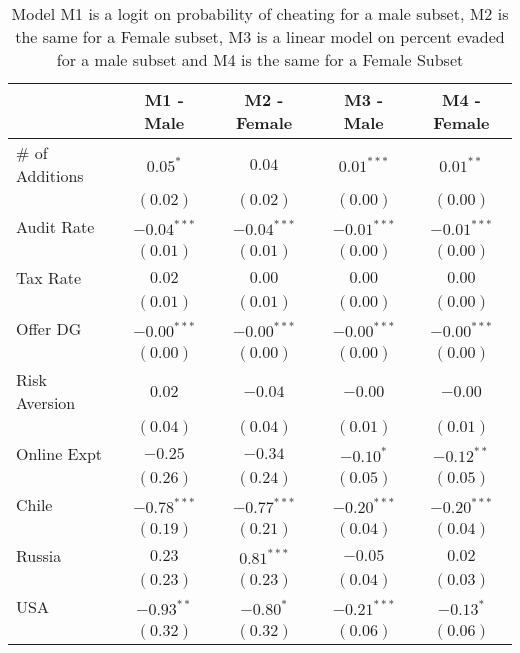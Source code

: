 
\begin{table}
\caption{Model M1 is a logit on probability of cheating for a male subset, M2 is the same for a Female subset, 
       M3 is a linear model on percent evaded for a male subset and M4 is the same for a Female Subset}
\begin{center}
\begin{tabular}{l c c c c }
\hline
 & M1 - Male & M2 - Female  & M3 - Male & M4 -Female \\
\hline
\# of Additions & $0.05^{*}$    & $0.04$        & $0.01^{***}$  & $0.01^{**}$   \\
                & $(0.02)$      & $(0.02)$      & $(0.00)$      & $(0.00)$      \\
Audit Rate      & $-0.04^{***}$ & $-0.04^{***}$ & $-0.01^{***}$ & $-0.01^{***}$ \\
                & $(0.01)$      & $(0.01)$      & $(0.00)$      & $(0.00)$      \\
Tax Rate        & $0.02$        & $0.00$        & $0.00$        & $0.00$        \\
                & $(0.01)$      & $(0.01)$      & $(0.00)$      & $(0.00)$      \\
Offer DG        & $-0.00^{***}$ & $-0.00^{***}$ & $-0.00^{***}$ & $-0.00^{***}$ \\
                & $(0.00)$      & $(0.00)$      & $(0.00)$      & $(0.00)$      \\
Risk Aversion   & $0.02$        & $-0.04$       & $-0.00$       & $-0.00$       \\
                & $(0.04)$      & $(0.04)$      & $(0.01)$      & $(0.01)$      \\
Online Expt     & $-0.25$       & $-0.34$       & $-0.10^{*}$   & $-0.12^{**}$  \\
                & $(0.26)$      & $(0.24)$      & $(0.05)$      & $(0.05)$      \\
Chile           & $-0.78^{***}$ & $-0.77^{***}$ & $-0.20^{***}$ & $-0.20^{***}$ \\
                & $(0.19)$      & $(0.21)$      & $(0.04)$      & $(0.04)$      \\
Russia          & $0.23$        & $0.81^{***}$  & $-0.05$       & $0.02$        \\
                & $(0.23)$      & $(0.23)$      & $(0.04)$      & $(0.03)$      \\
USA             & $-0.93^{**}$  & $-0.80^{*}$   & $-0.21^{***}$ & $-0.13^{*}$   \\
                & $(0.32)$      & $(0.32)$      & $(0.06)$      & $(0.06)$      \\

\end{tabular}
\end{center}
\end{table}
